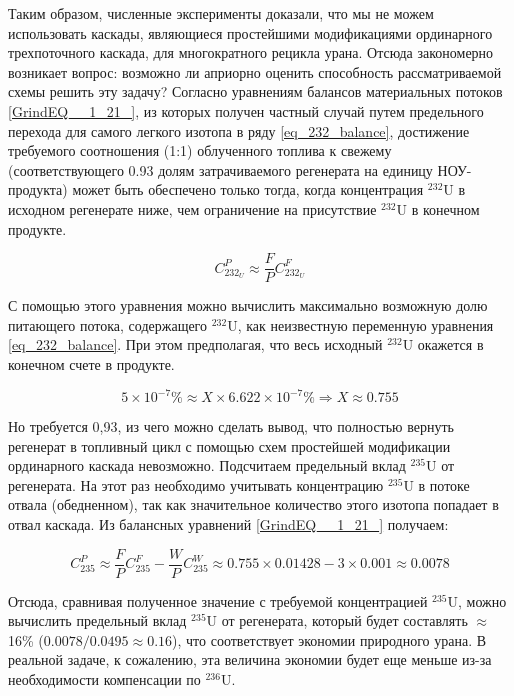 Таким образом, численные эксперименты доказали, что мы не можем использовать каскады, являющиеся простейшими модификациями ординарного трехпоточного каскада, для многократного рецикла урана. Отсюда закономерно возникает вопрос: возможно ли априорно оценить способность рассматриваемой схемы решить эту задачу? Согласно уравнениям балансов материальных потоков \ref{GrindEQ__1_21_}, из которых получен частный случай путем предельного перехода для самого легкого изотопа в ряду \ref{eq_232_balance}, достижение требуемого соотношения (1:1) облученного топлива к свежему (соответствующего 0.93 долям затрачиваемого регенерата на единицу НОУ-продукта) может быть обеспечено только тогда, когда концентрация $^{232}$U в исходном регенерате ниже, чем ограничение на присутствие $^{232}$U в конечном продукте.

\begin{equation}
\label{eq_232_balance}
  C_{232_{U}}^{P} \approx \frac{F}{P} C_{232_{U}}^{F}
\end{equation}

С помощью этого уравнения можно вычислить максимально возможную долю питающего потока, содержащего $^{232}$U, как неизвестную переменную уравнения \ref{eq_232_balance}. При этом предполагая, что весь исходный $^{232}$U окажется в конечном счете в продукте.

\begin{equation}
  \label{eq_232_balance_X}
    5 \times 10^{-7} \% \approx X \times 6.622 \times 10^{-7} \% \Rightarrow X \approx 0.755
\end{equation}

Но требуется 0,93, из чего можно сделать вывод, что полностью вернуть регенерат в топливный цикл с помощью схем простейшей модификации ординарного каскада невозможно.
Подсчитаем предельный вклад $^{235}$U от регенерата. На этот раз необходимо учитывать концентрацию $^{235}$U в потоке отвала (обедненном), так как значительное количество этого изотопа попадает в отвал каскада. Из балансных уравнений \ref{GrindEQ__1_21_} получаем:

\begin{equation}
  \label{eq_235_balance_X}
    C_{235}^{P} \approx \frac{F}{P} C_{235}^{F}-\frac{W}{P} C_{235}^{W} \approx 0.755 \times 0.01428-3 \times 0.001 \approx 0.0078
\end{equation}

Отсюда, сравнивая полученное значение с требуемой концентрацией $^{235}$U, можно вычислить предельный вклад $^{235}$U от регенерата, который будет составлять $\approx$16\% ($0.0078/0.0495\approx0.16$), что соответствует экономии природного урана. В реальной задаче, к сожалению, эта величина экономии будет еще меньше из-за необходимости компенсации по $^{236}$U.

